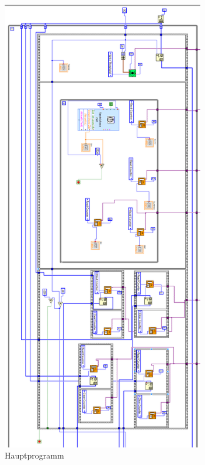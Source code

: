 \begin{figure}
\centering
\includegraphics[height=20cm]{data/friedrich/prog_prog_rot.png}
\caption{Hauptprogramm}
\label{fig:prog_prog}
\end{figure}

\FloatBarrier

